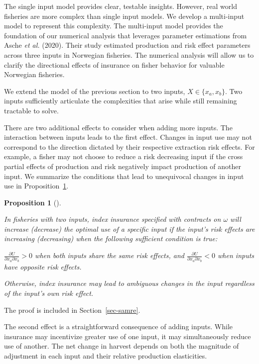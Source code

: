 \documentclass[
  letterpaper,
  DIV=11,
  numbers=noendperiod]{scrartcl}
\theoremstyle{plain}
\theoremstyle{plain}
\newtheorem{proposition}{Proposition}[section]
\theoremstyle{remark}
\begin{document}
The single input model provides clear, testable insights. However, real
world fisheries are more complex than single input models. We develop a
multi-input model to represent this complexity. The multi-input model
provides the foundation of our numerical analysis that leverages
parameter estimations from Asche \emph{et al.} (2020). Their study
estimated production and risk effect parameters across three inputs in
Norwegian fisheries. The numerical analysis will allow us to clarify the
directional effects of insurance on fisher behavior for valuable
Norwegian fisheries.

We extend the model of the previous section to two inputs,
\(X\in\{{x_a,x_b}\}\). Two inputs sufficiently articulate the
complexities that arise while still remaining tractable to solve.

There are two additional effects to consider when adding more inputs.
The interaction between inputs leads to the first effect. Changes in
input use may not correspond to the direction dictated by their
respective extraction risk effects. For example, a fisher may not choose
to reduce a risk decreasing input if the cross partial effects of
production and risk negatively impact production of another input. We
summarize the conditions that lead to unequivocal changes in input use
in Proposition~\ref{prp-samre}.

\begin{proposition}[]\protect\hypertarget{prp-samre}{}\label{prp-samre}

In fisheries with two inputs, index insurance specified with contracts
on \(\omega\) will increase (decrease) the optimal use of a specific
input if the input's risk effects are increasing (decreasing) when the
following sufficient condition is true:

\(\frac{\partial U}{\partial x_a\partial x_b}>0\) when both inputs share
the same risk effects, and
\(\frac{\partial U}{\partial x_a\partial x_b}<0\) when inputs have
opposite risk effects.

Otherwise, index insurance may lead to ambiguous changes in the input
regardless of the input's own risk effect.

\end{proposition}

The proof is included in Section~\ref{sec-samre}.

The second effect is a straightforward consequence of adding inputs.
While insurance may incentivize greater use of one input, it may
simultaneously reduce use of another. The net change in harvest depends
on both the magnitude of adjustment in each input and their relative
production elasticities.
\end{document}
